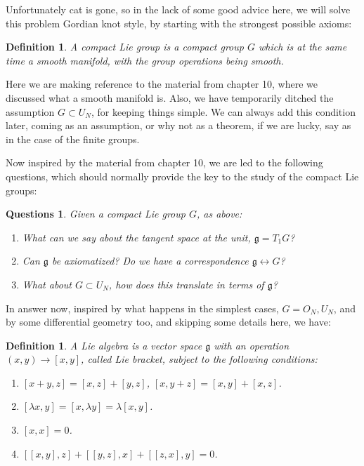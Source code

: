 \documentclass[12pt]{amsbook}
\newtheorem{definition}[theorem]{Definition}
\newtheorem{questions}[theorem]{Questions}
\begin{document}
\bigskip

Unfortunately cat is gone, so in the lack of some good advice here, we will solve this problem Gordian knot style, by starting with the strongest possible axioms:

\begin{definition}
A compact Lie group is a compact group $G$ which is at the same time a smooth manifold, with the group operations being smooth.
\end{definition}

Here we are making reference to the material from chapter 10, where we discussed what a smooth manifold is. Also, we have temporarily ditched the assumption $G\subset U_N$, for keeping things simple. We can always add this condition later, coming as an assumption, or why not as a theorem, if we are lucky, say as in the case of the finite groups.

\bigskip

Now inspired by the material from chapter 10, we are led to the following questions, which should normally provide the key to the study of the compact Lie groups:

\begin{questions}
Given a compact Lie group $G$, as above:
\begin{enumerate}
\item What can we say about the tangent space at the unit, $\mathfrak g=T_1G$? 

\item Can $\mathfrak g$ be axiomatized? Do we have a correspondence $\mathfrak g\leftrightarrow G$? 

\item What about $G\subset U_N$, how does this translate in terms of $\mathfrak g$?
\end{enumerate}
\end{questions}

In answer now, inspired by what happens in the simplest cases, $G=O_N,U_N$, and by some differential geometry too, and skipping some details here, we have:

\begin{definition}
A Lie algebra is a vector space $\mathfrak g$ with an operation $(x,y)\to[x,y]$, called Lie bracket, subject to the following conditions:
\begin{enumerate}
\item $[x+y,z]=[x,z]+[y,z]$, $[x,y+z]=[x,y]+[x,z]$.

\item $[\lambda x,y]=[x,\lambda y]=\lambda[x,y]$.

\item $[x,x]=0$.

\item $[[x,y],z]+[[y,z],x]+[[z,x],y]=0$.
\end{enumerate}
\end{definition}
\end{document}
